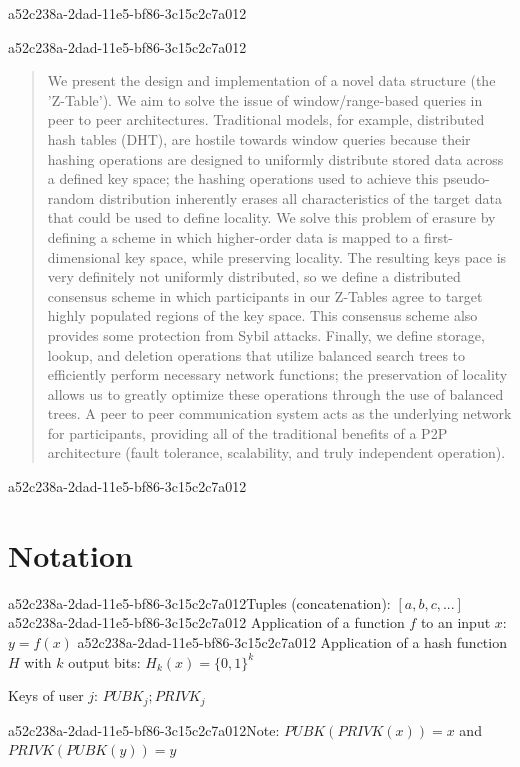 \documentclass[12pt]{article}
\begin{document}
a52c238a-2dad-11e5-bf86-3c15c2c7a012\maketitle
a52c238a-2dad-11e5-bf86-3c15c2c7a012
\begin{abstract}
We present the design and implementation of a novel data structure (the 'Z-Table'). We aim to solve the issue of window/range-based queries in peer to peer architectures. Traditional models, for example,  distributed hash tables (DHT), are hostile towards window queries because their hashing operations are designed to uniformly distribute stored data across a defined key space; the hashing operations used to achieve this pseudo-random distribution inherently erases all characteristics of the target data that could be used to define locality. We solve this problem of erasure by defining a scheme in which higher-order data is mapped to a first-dimensional key space, while preserving locality. The resulting keys pace is very definitely not uniformly distributed, so we define a distributed consensus scheme in which participants in our Z-Tables agree to target highly populated regions of the key space. This consensus scheme also provides some protection from Sybil attacks. Finally, we define storage, lookup, and deletion operations that utilize balanced search trees to efficiently perform necessary network functions; the preservation of locality allows us to greatly optimize these operations through the use of balanced trees. A peer to peer communication system acts as the underlying network for participants, providing all of the traditional benefits of a P2P architecture (fault tolerance, scalability, and truly independent operation).
\end{abstract}

a52c238a-2dad-11e5-bf86-3c15c2c7a012\section{Notation}

a52c238a-2dad-11e5-bf86-3c15c2c7a012Tuples (concatenation): $[a,b,c,...]$
a52c238a-2dad-11e5-bf86-3c15c2c7a012
Application of a function $f$ to an input $x$: $y=f(x)$
a52c238a-2dad-11e5-bf86-3c15c2c7a012
Application of a hash function $H$ with $k$ output bits: $H_{k}(x) = \{0,1\}^k$

Keys of user $j$: $ PUBK_j; PRIVK_j $

a52c238a-2dad-11e5-bf86-3c15c2c7a012Note: $PUBK(PRIVK(x)) = x$ and $PRIVK(PUBK(y)) = y$~
\end{document}
